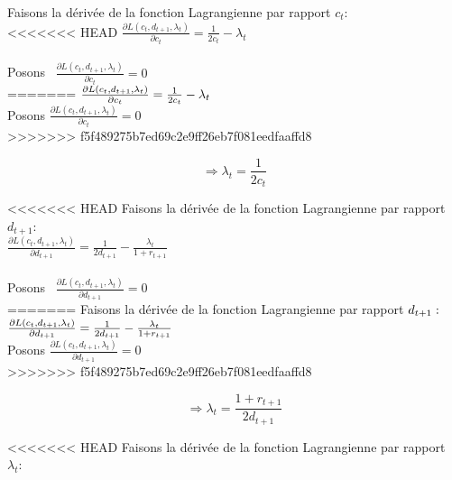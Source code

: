 \documentclass[11pt,twoside,a4paper]{article}
\begin{document}
Faisons la dérivée de la fonction Lagrangienne par rapport $c_t :  $ \\

<<<<<<< HEAD
$
\frac{\partial L(c_t,d_{t+1},\lambda_t)}{\partial c_t} = \frac{1}{2c_t} - \lambda_t 
$ \\ \\

Posons  \ $ \frac{\partial L(c_t,d_{t+1},\lambda_t)}{\partial c_t} = 0  $ \\
=======
$\\
\frac{\partial L(c_t,d_{t+1},\lambda_t)}{\partial c_t} = \frac{1}{2c_t} - \lambda_t 
$ \\
Posons  $ \frac{\partial L(c_t,d_{t+1},\lambda_t)}{\partial c_t} = 0  $ \\
>>>>>>> f5f489275b7ed69c2e9ff26eb7f081eedfaaffd8



\begin{equation}\label{eq:test1}
  \Rightarrow \lambda_t=\frac{1}{2c_t}
\end{equation} 


<<<<<<< HEAD
Faisons la dérivée de la fonction Lagrangienne par rapport $d_{t+1} : $\\ 

$
\frac{\partial L(c_t,d_{t+1},\lambda_t)}{\partial d_{t+1}} = \frac{1}{2 d_{t+1}} - \frac{\lambda_t}{1+r_{t+1}} 
$\\ \\

Posons \ $ \frac{\partial L(c_t,d_{t+1},\lambda_t)}{\partial d_{t+1}} = 0 $ \\
=======
Faisons la dérivée de la fonction Lagrangienne par rapport $d_{t+1} : \\ $
$\\
\frac{\partial L(c_t,d_{t+1},\lambda_t)}{\partial d_{t+1}} = \frac{1}{2 d_{t+1}} - \frac{\lambda_t}{1+r_{t+1}} 
$\\

Posons  $ \frac{\partial L(c_t,d_{t+1},\lambda_t)}{\partial d_{t+1}} = 0 $ \\
>>>>>>> f5f489275b7ed69c2e9ff26eb7f081eedfaaffd8

  \begin{equation}\label{eq:test2}
  \Rightarrow \lambda_t=\frac{1+r_{t+1}}{2 d_{t+1}}
\end{equation}  

<<<<<<< HEAD
Faisons la dérivée de la fonction Lagrangienne par rapport $\lambda_t :  $ \\ \\
 
\end{document}
